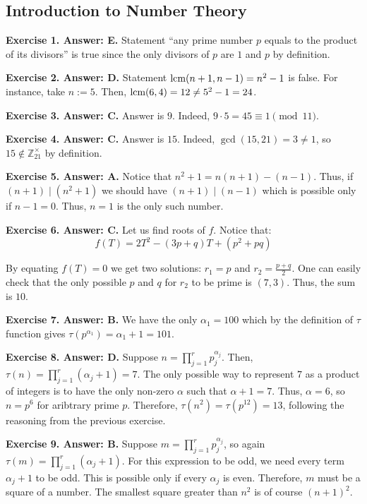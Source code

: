 \documentclass[../../book]{subfiles}
\begin{document}
\subsection*{Introduction to Number Theory}

\textbf{Exercise 1. Answer: E.} Statement ``any prime number $p$ equals to 
the product of its divisors'' is true since the only divisors of $p$
are $1$ and $p$ by definition.

\textbf{Exercise 2. Answer: D.} Statement $\text{lcm}(n+1,n-1)=n^2-1$ is false. For 
instance, take $n := 5$. Then, $\text{lcm}(6,4) = 12 \neq 5^2-1 = 24$. 

\textbf{Exercise 3. Answer: C.} Answer is $9$. Indeed, $9 \cdot 5 = 45 \equiv 1 \pmod{11}$.

\textbf{Exercise 4. Answer: C.} Answer is $15$. Indeed, $\gcd(15, 21) = 3 \neq 1$, so 
$15 \not\in \mathbb{Z}_{21}^{\times}$ by definition.

\textbf{Exercise 5. Answer: A.} Notice that $n^2+1=n(n+1)-(n-1)$. Thus, if 
$(n+1)\mid(n^2+1)$ we should have $(n+1)\mid (n-1)$ which is possible 
only if $n-1=0$. Thus, $n=1$ is the only such number.

\textbf{Exercise 6. Answer: C.} Let us find roots of $f$. Notice that:
\begin{equation*}
    f(T) = 2T^2 - (3p+q)T + (p^2 + pq)
\end{equation*}

By equating $f(T)=0$ we get two solutions: $r_1 = p$ and $r_2=\frac{p+q}{2}$. One 
can easily check that the only possible $p$ and $q$ for $r_2$ to be prime is $(7,3)$.
Thus, the sum is $10$.

\textbf{Exercise 7. Answer: B.} We have the only $\alpha_1=100$ which 
by the definition of $\tau$ function gives $\tau(p^{\alpha_1})=\alpha_1+1=101$.

\textbf{Exercise 8. Answer: D.} Suppose $n=\prod_{j=1}^r p_j^{\alpha_j}$. Then,
$\tau(n) = \prod_{j=1}^r (\alpha_j+1) = 7$. The only possible way to represent $7$
as a product of integers is to have the only non-zero $\alpha$ such that $\alpha+1=7$.
Thus, $\alpha=6$, so $n=p^6$ for aribtrary prime $p$. Therefore, $\tau(n^2)=\tau(p^{12})=13$, 
following the reasoning from the previous exercise.

\textbf{Exercise 9. Answer: B.} Suppose $m=\prod_{j=1}^rp_j^{\alpha_j}$, so 
again $\tau(m) = \prod_{j=1}^r (\alpha_j+1)$. For this expression to be odd, we 
need every term $\alpha_j+1$ to be odd. This is possible only if every $\alpha_j$ is even.
Therefore, $m$ must be a square of a number. The smallest square greater than $n^2$ is 
of course $(n+1)^2$.
\end{document}
